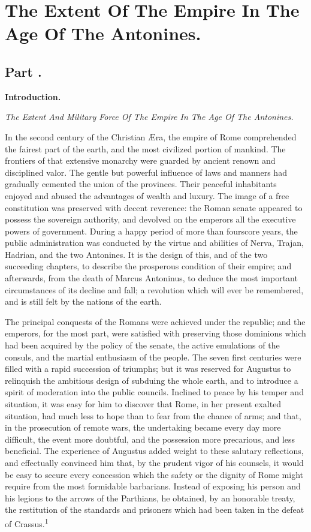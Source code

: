\chapter{The Extent Of The Empire In The Age Of The Antonines.}
\section{Part \thesection.}
\begin{center}
\textbf{\large Introduction.}
\end{center}

\textit{The Extent And Military Force Of The Empire In The Age Of The Antonines.}
\vspace{\onelineskip}

In the second century of the Christian Æra, the empire of Rome
comprehended the fairest part of the earth, and the most
civilized portion of mankind. The frontiers of that extensive
monarchy were guarded by ancient renown and disciplined valor.
The gentle but powerful influence of laws and manners had
gradually cemented the union of the provinces. Their peaceful
inhabitants enjoyed and abused the advantages of wealth and
luxury. The image of a free constitution was preserved with
decent reverence: the Roman senate appeared to possess the
sovereign authority, and devolved on the emperors all the
executive powers of government. During a happy period of more
than fourscore years, the public administration was conducted by
the virtue and abilities of Nerva, Trajan, Hadrian, and the two
Antonines. It is the design of this, and of the two succeeding
chapters, to describe the prosperous condition of their empire;
and afterwards, from the death of Marcus Antoninus, to deduce the
most important circumstances of its decline and fall; a
revolution which will ever be remembered, and is still felt by
the nations of the earth.

The principal conquests of the Romans were achieved under the
republic; and the emperors, for the most part, were satisfied
with preserving those dominions which had been acquired by the
policy of the senate, the active emulations of the consuls, and
the martial enthusiasm of the people. The seven first centuries
were filled with a rapid succession of triumphs; but it was
reserved for Augustus to relinquish the ambitious design of
subduing the whole earth, and to introduce a spirit of moderation
into the public councils. Inclined to peace by his temper and
situation, it was easy for him to discover that Rome, in her
present exalted situation, had much less to hope than to fear
from the chance of arms; and that, in the prosecution of remote
wars, the undertaking became every day more difficult, the event
more doubtful, and the possession more precarious, and less
beneficial. The experience of Augustus added weight to these
salutary reflections, and effectually convinced him that, by the
prudent vigor of his counsels, it would be easy to secure every
concession which the safety or the dignity of Rome might require
from the most formidable barbarians. Instead of exposing his
person and his legions to the arrows of the Parthians, he
obtained, by an honorable treaty, the restitution of the
standards and prisoners which had been taken in the defeat of
Crassus.\textsuperscript{1}

